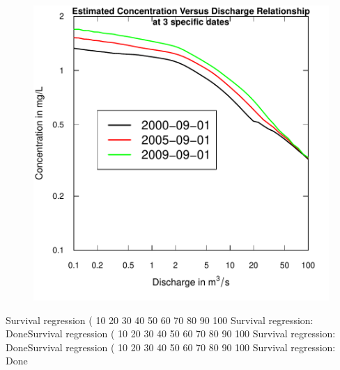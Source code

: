 \documentclass[a4paper,11pt]{article}
\begin{document}
\begin{figure}[htbp]
\begin{minipage}[h]{0.5\linewidth}
\begin{center}
\includegraphics{EGRET-figplotLogConcQSmooth}
    \label{fig:plotLogConcQSmooth}
    \end{center}
  \end{minipage}
  \caption{}
  \label{fig:plotConcQSmoothANDplotLogConcQSmooth}
\end{figure}

\begin{Schunk}
\begin{Soutput}
Survival regression (%
10 	20 	30 	40 	50 	60 	70 	80 	90 	100 	
Survival regression: DoneSurvival regression (%
10 	20 	30 	40 	50 	60 	70 	80 	90 	100 	
Survival regression: DoneSurvival regression (%
10 	20 	30 	40 	50 	60 	70 	80 	90 	100 	
Survival regression: Done
\end{Soutput}
\end{Schunk}
\end{document}
